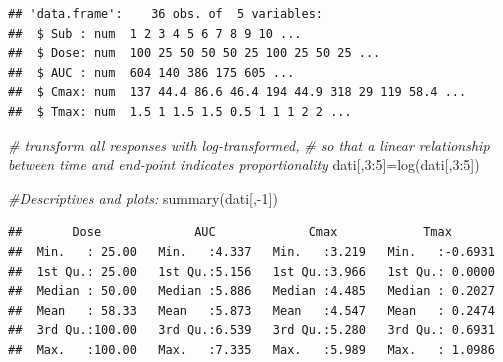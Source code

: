 \documentclass[
]{article}
\newenvironment{Shaded}{\begin{snugshade}}{\end{snugshade}}
\newcommand{\CommentTok}[1]{\textcolor[rgb]{0.56,0.35,0.01}{\textit{#1}}}
\newcommand{\DecValTok}[1]{\textcolor[rgb]{0.00,0.00,0.81}{#1}}
\newcommand{\FunctionTok}[1]{\textcolor[rgb]{0.00,0.00,0.00}{#1}}
\newcommand{\NormalTok}[1]{#1}
\newcommand{\OtherTok}[1]{\textcolor[rgb]{0.56,0.35,0.01}{#1}}
\newcommand{\SpecialCharTok}[1]{\textcolor[rgb]{0.00,0.00,0.00}{#1}}
\begin{document}
\begin{verbatim}
## 'data.frame':    36 obs. of  5 variables:
##  $ Sub : num  1 2 3 4 5 6 7 8 9 10 ...
##  $ Dose: num  100 25 50 50 50 25 100 25 50 25 ...
##  $ AUC : num  604 140 386 175 605 ...
##  $ Cmax: num  137 44.4 86.6 46.4 194 44.9 318 29 119 58.4 ...
##  $ Tmax: num  1.5 1 1.5 1.5 0.5 1 1 1 2 2 ...
\end{verbatim}

\begin{Shaded}
\begin{Highlighting}[]
\CommentTok{\# transform all responses with log{-}transformed, }
\CommentTok{\# so that a linear relationship between time and end{-}point indicates proportionality }
\NormalTok{dati[,}\DecValTok{3}\SpecialCharTok{:}\DecValTok{5}\NormalTok{]}\OtherTok{=}\FunctionTok{log}\NormalTok{(dati[,}\DecValTok{3}\SpecialCharTok{:}\DecValTok{5}\NormalTok{])}
\end{Highlighting}
\end{Shaded}

\begin{Shaded}
\begin{Highlighting}[]
\CommentTok{\#Descriptives and plots:}
\FunctionTok{summary}\NormalTok{(dati[,}\SpecialCharTok{{-}}\DecValTok{1}\NormalTok{])}
\end{Highlighting}
\end{Shaded}

\begin{verbatim}
##       Dose             AUC             Cmax            Tmax        
##  Min.   : 25.00   Min.   :4.337   Min.   :3.219   Min.   :-0.6931  
##  1st Qu.: 25.00   1st Qu.:5.156   1st Qu.:3.966   1st Qu.: 0.0000  
##  Median : 50.00   Median :5.886   Median :4.485   Median : 0.2027  
##  Mean   : 58.33   Mean   :5.873   Mean   :4.547   Mean   : 0.2474  
##  3rd Qu.:100.00   3rd Qu.:6.539   3rd Qu.:5.280   3rd Qu.: 0.6931  
##  Max.   :100.00   Max.   :7.335   Max.   :5.989   Max.   : 1.0986
\end{verbatim}

\begin{Shaded}
\end{Shaded}
\end{document}
